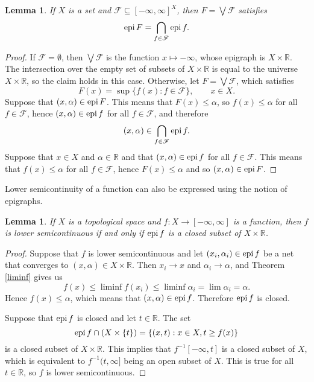 \documentclass{article}
\newcommand{\epi}{\ensuremath\mathrm{epi}\,}
\newtheorem{lemma}[theorem]{Lemma}
\theoremstyle{definition}
\begin{document}
\begin{lemma}
If $X$ is a set and $\mathscr{F} \subseteq [-\infty,\infty]^X$, then $F=\bigvee \mathscr{F}$ satisfies
\[
\epi F = \bigcap_{f \in \mathscr{F}} \epi f.
\]
\label{epigraphintersection}
\end{lemma}
\begin{proof}
If $\mathscr{F} = \emptyset$, then $\bigvee \mathscr{F}$ is the function $x \mapsto -\infty$, whose epigraph is $X \times \mathbb{R}$.
The intersection over the empty set of subsets of $X \times \mathbb{R}$ is equal to the universe $X \times \mathbb{R}$, so the claim holds in this case.
 Otherwise, let
$F = \bigvee \mathscr{F}$, which satisfies
\[
F(x) = \sup\{ f(x): f \in \mathscr{F}\}, \qquad x \in X.
\]
Suppose that $(x,\alpha) \in \epi F$. This means that $F(x) \leq \alpha$, so $f(x) \leq \alpha$ for all $f \in \mathscr{F}$, hence
$(x,\alpha) \in \epi f$ for all $f \in \mathscr{F}$, and therefore
\[
(x,\alpha) \in \bigcap_{f \in \mathscr{F}} \epi f.
\]
Suppose that $x \in X$ and $\alpha \in \mathbb{R}$ and that $(x,\alpha) \in \epi f$ for all $f \in \mathscr{F}$. This means
that $f(x) \leq \alpha$ for all $f \in \mathscr{F}$, hence $F(x) \leq \alpha$ and so $(x,\alpha) \in \epi F$.
\end{proof}

Lower semicontinuity of a function can also be expressed using the notion of epigraphs.

\begin{lemma}
If $X$ is a topological space and $f:X \to [-\infty,\infty]$ is a function, then $f$ is lower semicontinuous if and only if
$\epi f$ is a closed subset of $X \times \mathbb{R}$. 
\label{epilsc}
\end{lemma}
\begin{proof}
Suppose that $f$ is lower semicontinuous and let $(x_i,\alpha_i) \in \epi f$ be a net that converges to $(x,\alpha) \in X \times \mathbb{R}$.
Then $x_i \to x$ and $\alpha_i \to \alpha$, and 
Theorem \ref{liminf} gives us
\[
f(x) \leq \liminf f(x_i) \leq \liminf \alpha_i = \lim \alpha_i = \alpha.
\]
Hence $f(x) \leq \alpha$, which means that $(x,\alpha) \in \epi f$. Therefore $\epi f$ is closed.

Suppose that $\epi f$ is closed and let $t \in \mathbb{R}$. The set
\[
\epi f \cap (X \times \{t\}) = \{(x,t): x \in X, t \geq f(x) \}
\]
 is a closed subset of $X \times \mathbb{R}$. This implies that $f^{-1}[-\infty,t]$ is a closed subset of $X$, which is equivalent to $f^{-1}(t,\infty]$ being an open subset of
 $X$. This is true for all $t \in \mathbb{R}$, so $f$ is lower semicontinuous.
\end{proof}
\end{document}
